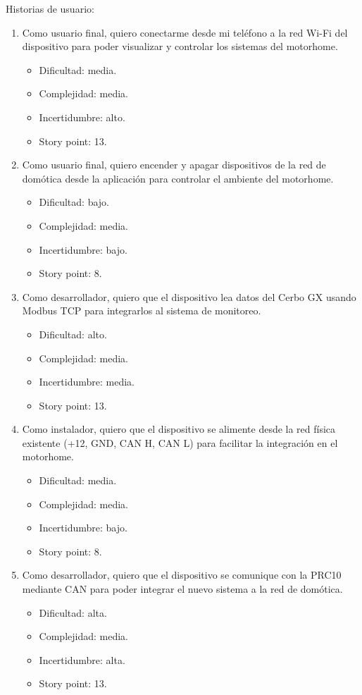 \documentclass[
11pt, %
]{charter}
\begin{document}
Historias de usuario:
\begin{enumerate}
	\item Como usuario final, quiero conectarme desde mi teléfono a la red Wi-Fi del dispositivo para poder visualizar y controlar los sistemas del motorhome.
		\begin{itemize}
			\item Dificultad: media.
			\item Complejidad: media.
			\item Incertidumbre: alto.
			\item Story point: 13.
	\end{itemize}
	\item Como usuario final, quiero encender y apagar dispositivos de la red de domótica desde la aplicación para controlar el ambiente del motorhome.
		\begin{itemize}
			\item Dificultad: bajo.
			\item Complejidad: media.
			\item Incertidumbre: bajo.
			\item Story point: 8.
	\end{itemize}
	\item Como desarrollador, quiero que el dispositivo lea datos del Cerbo GX usando Modbus TCP para integrarlos al sistema de monitoreo.
		\begin{itemize}
			\item Dificultad: alto.
			\item Complejidad: media.
			\item Incertidumbre: media.
			\item Story point: 13.
	\end{itemize}
	\item Como instalador, quiero que el dispositivo se alimente desde la red física existente (+12, GND, CAN H, CAN L) para facilitar la integración en el motorhome.
		\begin{itemize}
			\item Dificultad: media.
			\item Complejidad: media.
			\item Incertidumbre: bajo.
			\item Story point: 8.
	\end{itemize}
	\item Como desarrollador, quiero que el dispositivo se comunique con la PRC10 mediante CAN para poder integrar el nuevo sistema a la red de domótica.
		\begin{itemize}
			\item Dificultad: alta.
			\item Complejidad: media.
			\item Incertidumbre: alta.
			\item Story point: 13.
	\end{itemize}
\end{enumerate}
\end{document}
